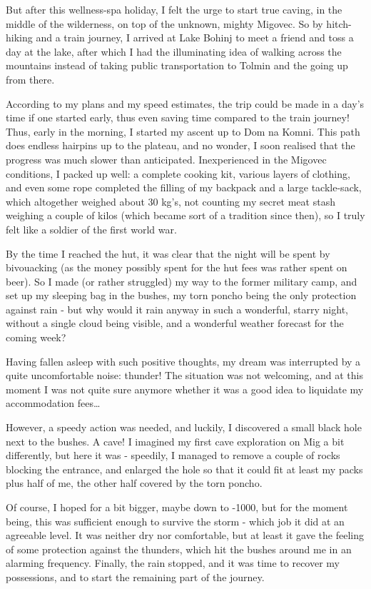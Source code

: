 But after this wellness-spa holiday, I felt the urge to start true
caving, in the middle of the wilderness, on top of the unknown, mighty
Migovec. So by hitch-hiking and a train journey, I arrived at Lake
Bohinj to meet a friend and toss a day at the lake, after which I had
the illuminating idea of walking across the mountains instead of taking
public transportation to Tolmin and the going up from there.

According to my plans and my speed estimates, the trip could be made in
a day's time if one started early, thus even saving time compared to the
train journey! Thus, early in the morning, I started my ascent up to Dom
na Komni. This path does endless hairpins up to the plateau, and no
wonder, I soon realised that the progress was much slower than
anticipated. Inexperienced in the Migovec conditions, I packed up well:
a complete cooking kit, various layers of clothing, and even some rope
completed the filling of my backpack and a large tackle-sack, which
altogether weighed about 30 kg's, not counting my secret meat stash
weighing a couple of kilos (which became sort of a tradition since
then), so I truly felt like a soldier of the first world war.

By the time I reached the hut, it was clear that the night will be spent
by bivouacking (as the money possibly spent for the hut fees was rather
spent on beer). So I made (or rather struggled) my way to the former
military camp, and set up my sleeping bag in the bushes, my torn poncho
being the only protection against rain - but why would it rain anyway in
such a wonderful, starry night, without a single cloud being visible,
and a wonderful weather forecast for the coming week?

Having fallen asleep with such positive thoughts, my dream was
interrupted by a quite uncomfortable noise: thunder! The situation was
not welcoming, and at this moment I was not quite sure anymore whether
it was a good idea to liquidate my accommodation fees\ldots{}

However, a speedy action was needed, and luckily, I discovered a small
black hole next to the bushes. A cave! I imagined my first cave
exploration on Mig a bit differently, but here it was - speedily, I
managed to remove a couple of rocks blocking the entrance, and enlarged
the hole so that it could fit at least my packs plus half of me, the
other half covered by the torn poncho.

Of course, I hoped for a bit bigger, maybe down to -1000, but for the
moment being, this was sufficient enough to survive the storm - which
job it did at an agreeable level. It was neither dry nor comfortable,
but at least it gave the feeling of some protection against the
thunders, which hit the bushes around me in an alarming frequency.
Finally, the rain stopped, and it was time to recover my possessions,
and to start the remaining part of the journey.

